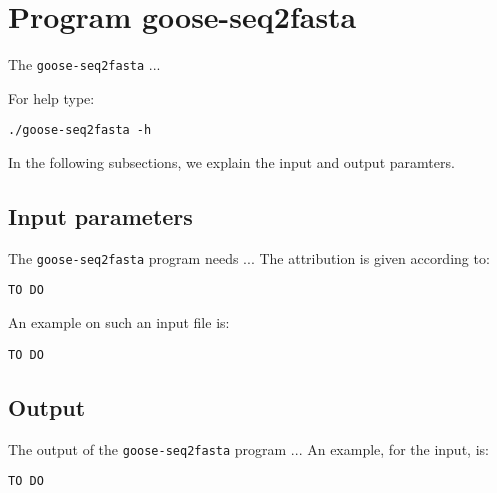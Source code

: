 \section{Program goose-seq2fasta}
The \texttt{goose-seq2fasta} ...

For help type:
\begin{lstlisting}
./goose-seq2fasta -h
\end{lstlisting}
In the following subsections, we explain the input and output paramters.

\subsection*{Input parameters}

The \texttt{goose-seq2fasta} program needs ...
The attribution is given according to:
\begin{lstlisting}
TO DO
\end{lstlisting}

An example on such an input file is:
\begin{lstlisting}
TO DO
\end{lstlisting}

\subsection*{Output}
The output of the \texttt{goose-seq2fasta} program ...
An example, for the input, is:
\begin{lstlisting}
TO DO
\end{lstlisting}
